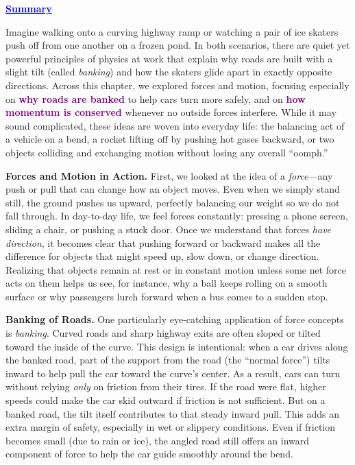 \documentclass[12pt]{article}
\begin{document}
\begin{center}
{\LARGE \bfseries \textcolor{blue}{\underline{Summary}}}
\end{center}

\noindent
\onehalfspacing
Imagine walking onto a curving highway ramp or watching a pair of ice skaters push off from one another on a frozen pond. In both scenarios, there are quiet yet powerful principles of physics at work that explain why roads are built with a slight tilt (called \emph{banking}) and how the skaters glide apart in exactly opposite directions. Across this chapter, we explored forces and motion, focusing especially on \textcolor{purple}{\textbf{why roads are banked}} to help cars turn more safely, and on \textcolor{purple}{\textbf{how momentum is conserved}} whenever no outside forces interfere. While it may sound complicated, these ideas are woven into everyday life: the balancing act of a vehicle on a bend, a rocket lifting off by pushing hot gases backward, or two objects colliding and exchanging motion without losing any overall “oomph.” 

\vspace{0.5em}
\noindent
\textbf{Forces and Motion in Action.} First, we looked at the idea of a \emph{force}---any push or pull that can change how an object moves. Even when we simply stand still, the ground pushes us upward, perfectly balancing our weight so we do not fall through. In day-to-day life, we feel forces constantly: pressing a phone screen, sliding a chair, or pushing a stuck door. Once we understand that forces \emph{have direction}, it becomes clear that pushing forward or backward makes all the difference for objects that might speed up, slow down, or change direction. Realizing that objects remain at rest or in constant motion unless some net force acts on them helps us see, for instance, why a ball keeps rolling on a smooth surface or why passengers lurch forward when a bus comes to a sudden stop. 

\vspace{0.5em}
\noindent
\textbf{Banking of Roads.} One particularly eye-catching application of force concepts is \emph{banking}. Curved roads and sharp highway exits are often sloped or tilted toward the inside of the curve. This design is intentional: when a car drives along the banked road, part of the support from the road (the “normal force”) tilts inward to help pull the car toward the curve’s center. As a result, cars can turn without relying \emph{only} on friction from their tires. If the road were flat, higher speeds could make the car skid outward if friction is not sufficient. But on a banked road, the tilt itself contributes to that steady inward pull. This adds an extra margin of safety, especially in wet or slippery conditions. Even if friction becomes small (due to rain or ice), the angled road still offers an inward component of force to help the car guide smoothly around the bend. 
\end{document}
